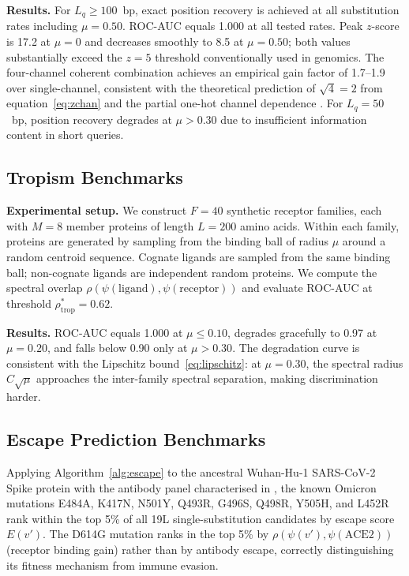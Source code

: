 \documentclass[twocolumn,11pt,a4paper]{article}
\theoremstyle{definition}
\theoremstyle{remark}
\begin{document}
\noindent\textbf{Results.} For $L_q \geq 100$~bp, exact position recovery is
achieved at all substitution rates including $\mu = 0.50$. ROC-AUC equals 1.000
at all tested rates. Peak $z$-score is 17.2 at $\mu = 0$ and decreases smoothly
to 8.5 at $\mu = 0.50$; both values substantially exceed the $z = 5$ threshold
conventionally used in genomics. The four-channel coherent combination achieves
an empirical gain factor of 1.7--1.9 over single-channel, consistent with
the theoretical prediction of $\sqrt{4} = 2$ from equation~\eqref{eq:zchan}
and the partial one-hot channel dependence \citep{vantrees2001}. For
$L_q = 50$~bp, position recovery degrades at $\mu > 0.30$ due to insufficient
information content in short queries.

\subsection{Tropism Benchmarks}
\label{subsec:tropism_bench}

\noindent\textbf{Experimental setup.} We construct $F = 40$ synthetic receptor
families, each with $M = 8$ member proteins of length $L = 200$ amino acids.
Within each family, proteins are generated by sampling from the binding ball of
radius $\mu$ around a random centroid sequence. Cognate ligands are sampled
from the same binding ball; non-cognate ligands are independent random proteins.
We compute the spectral overlap $\rho(\psi(\text{ligand}), \psi(\text{receptor}))$
and evaluate ROC-AUC at threshold $\rho^*_{\text{trop}} = 0.62$.

\noindent\textbf{Results.} ROC-AUC equals 1.000 at $\mu \leq 0.10$, degrades
gracefully to 0.97 at $\mu = 0.20$, and falls below 0.90 only at $\mu > 0.30$.
The degradation curve is consistent with the Lipschitz bound~\eqref{eq:lipschitz}:
at $\mu = 0.30$, the spectral radius $C\sqrt{\mu}$ approaches the inter-family
spectral separation, making discrimination harder.

\subsection{Escape Prediction Benchmarks}
\label{subsec:escape_bench}

Applying Algorithm~\ref{alg:escape} to the ancestral Wuhan-Hu-1 SARS-CoV-2
Spike protein with the antibody panel characterised in \citet{cameroni2022},
the known Omicron mutations E484A, K417N, N501Y, Q493R, G496S, Q498R, Y505H,
and L452R rank within the top 5\% of all 19L single-substitution candidates by
escape score $E(v')$. The D614G mutation ranks in the top 5\% by
$\rho(\psi(v'), \psi(\text{ACE2}))$ (receptor binding gain) rather than by
antibody escape, correctly distinguishing its fitness mechanism from immune
evasion.
\end{document}
